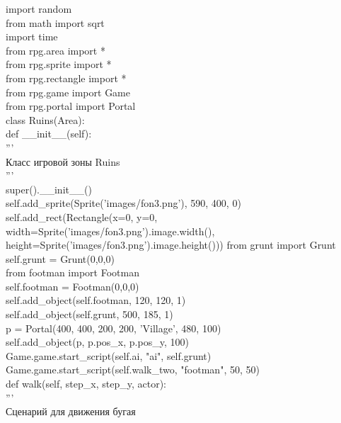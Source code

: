 import random\\
from math import sqrt\\
import time\\
from rpg.area import *\\
from rpg.sprite import *\\
from rpg.rectangle import *\\
from rpg.game import Game\\
from rpg.portal import Portal\\

class Ruins(Area):\\
def \_\_init\_\_(self):\\
'''\\
Класс игровой зоны Ruins\\

'''\\
super().\_\_init\_\_()\\
self.add\_sprite(Sprite('images/fon3.png'), 590, 400, 0)\\
self.add\_rect(Rectangle(x=0, y=0, width=Sprite('images/fon3.png').image.width(),\\ height=Sprite('images/fon3.png').image.height()))
from grunt import Grunt\\
self.grunt = Grunt(0,0,0)\\
from footman import Footman\\
self.footman = Footman(0,0,0)\\
self.add\_object(self.footman, 120, 120, 1)\\
self.add\_object(self.grunt, 500, 185, 1)\\
p = Portal(400, 400, 200, 200, 'Village', 480, 100)\\
self.add\_object(p, p.pos\_x, p.pos\_y, 100)\\
Game.game.start\_script(self.ai, "ai", self.grunt)\\
Game.game.start\_script(self.walk\_two, "footman", 50, 50)\\


def walk(self, step\_x, step\_y, actor):\\
'''\\
Сценарий для движения бугая\\

